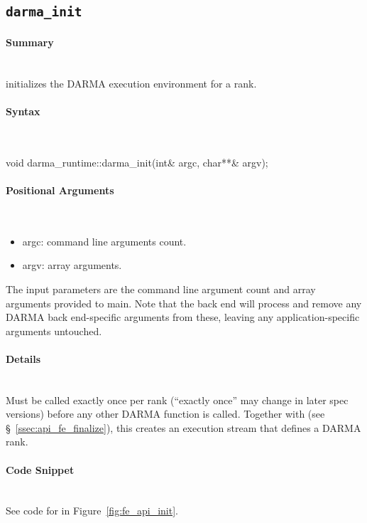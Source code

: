 
\subsection{\texttt{darma\_init}}
\label{subsec:darma_init}

\paragraph{Summary}\mbox{}\\
 initializes the \gls{DARMA} execution environment for a \gls{rank}.

\paragraph{Syntax}\mbox{}\\
\begin{CppCode}
void darma_runtime::darma_init(int& argc, char**& argv);
\end{CppCode}

\paragraph{Positional Arguments}\mbox{}\\
\begin{itemize}
\item argc: command line arguments count.
\item argv: array arguments.
\end{itemize}
The input parameters are the command line argument count 
and array arguments provided to main.  
Note that the  back end will process and remove 
any \gls{DARMA} \gls{back end}-specific arguments from these, leaving any
application-specific arguments untouched.


\paragraph{Details}\mbox{}\\
Must be called exactly once per \gls{rank} (``exactly once'' may change in later
spec versions) before any other \gls{DARMA} function is called.
Together with  (see \S~\ref{ssec:api_fe_finalize}),
this creates an \gls{execution stream} that defines a \gls{DARMA} \gls{rank}.

\paragraph{Code Snippet}\mbox{}\\ 
See code for  in Figure~\ref{fig:fe_api_init}.

